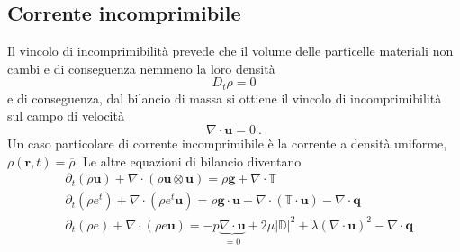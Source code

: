 \subsection{Corrente incomprimibile}
Il vincolo di incomprimibilità prevede che il volume delle particelle materiali non cambi e di conseguenza nemmeno la loro densità
\begin{equation}
    D_t \rho = 0
\end{equation}
e di conseguenza, dal bilancio di massa si ottiene il vincolo di incomprimibilità sul campo di velocità
\begin{equation}
    \nabla \cdot \mathbf{u} = 0 \ .
\end{equation}
Un caso particolare di corrente incomprimibile è la corrente a densità uniforme, $\rho(\mathbf{r},t) = \overline{\rho}$.
Le altre equazioni di bilancio diventano
\begin{equation}
\begin{aligned}
    & \partial_t \left( \rho \mathbf{u} \right) + \nabla \cdot \left( \rho \mathbf{u} \otimes \mathbf{u} \right) = \rho \mathbf{g} + \nabla \cdot \mathbb{T} \\
    & \partial_t \left( \rho e^t \right) + \nabla \cdot \left( \rho e^t \mathbf{u} \right) = \rho \mathbf{g} \cdot \mathbf{u} + \nabla \cdot ( \mathbb{T} \cdot \mathbf{u} ) - \nabla \cdot \mathbf{q} \\
    & \partial_t \left( \rho e   \right) + \nabla \cdot \left( \rho e   \mathbf{u} \right) = - p \underbrace{\nabla \cdot \mathbf{u}}_{=0} + 2 \mu |\mathbb{D}|^2 + \lambda (\nabla \cdot \mathbf{u})^2 - \nabla \cdot \mathbf{q} \\
\end{aligned}
\end{equation}


